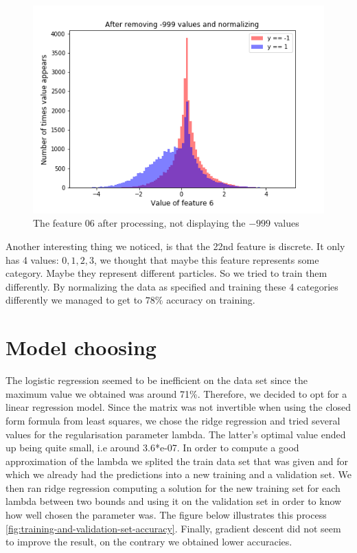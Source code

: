 \documentclass[10pt,conference,compsocconf]{IEEEtran}
\begin{document}
\begin{figure}[h!]
	\centering
  \includegraphics[width=\columnwidth]{graph-features/feature-06-processed.png}
  \caption{The feature 06 after processing, not displaying the $-999$ values}
	\label{fig:feature-06-processed}
\end{figure}

Another interesting thing we noticed, is that the 22nd feature is discrete. It only has 4 values: ${0,1,2,3}$, we thought that maybe this feature represents some category. Maybe they represent different particles. So we tried to train them differently. By normalizing the data as specified and training these 4 categories differently we managed to get to $78\%$ accuracy on training.

\section{Model choosing}
\label{sec:model-choosing}
The logistic regression seemed to be inefficient on the data set since the maximum value we obtained was around 71\%. Therefore, we decided to opt for a linear regression model. Since the matrix was not invertible when using the closed form formula from least squares, we chose the ridge regression and tried several values for the regularisation parameter lambda. The latter's optimal value ended up being quite small, i.e around 3.6*e-07. In order to compute a good approximation of the lambda we splited the train data set that was given and for which we already had the predictions into a new training and a validation set. We then ran ridge regression computing a solution for the new training set for each lambda between two bounds and using it on the validation set in order to know how well chosen the parameter was. The figure below illustrates this process \ref{fig:training-and-validation-set-accuracy}. Finally, gradient descent did not seem to improve the result, on the contrary we obtained lower accuracies.
\end{document}
